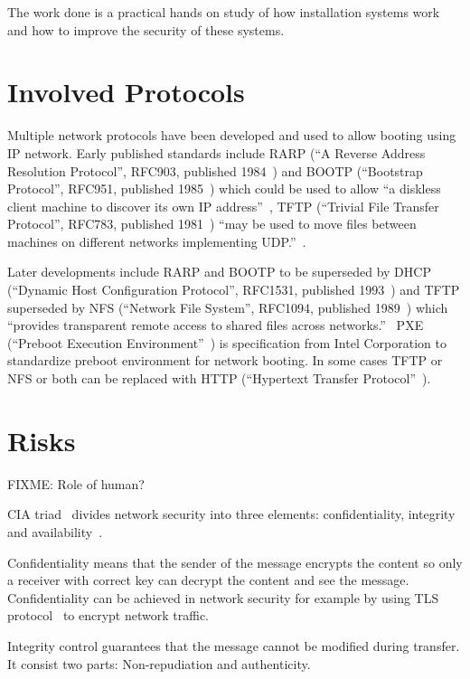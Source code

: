 The work done is a practical hands on study of how installation
systems work and how to improve the security of these systems.

\section{Involved Protocols}

Multiple network protocols have been developed and used to allow
booting using IP network. Early published standards include RARP (``A
Reverse Address Resolution Protocol'', RFC903, published
1984~\cite{RFC903}) and BOOTP (``Bootstrap Protocol'', RFC951,
published 1985~\cite{RFC951}) which could be used to allow ``a
diskless client machine to discover its own IP
address''~\cite{RFC951}, TFTP (``Trivial File Transfer Protocol'',
RFC783, published 1981~\cite{RFC783}) ``may be used to move files
between machines on different networks implementing
UDP.''~\cite{RFC783}.

Later developments include RARP and BOOTP to be superseded by DHCP
(``Dynamic Host Configuration Protocol'', RFC1531, published
1993~\cite{RFC1531}) and TFTP superseded by NFS (``Network File
System'', RFC1094, published 1989~\cite{RFC1094}) which ``provides
transparent remote access to shared files across
networks.''~\cite{RFC1094} PXE (``Preboot Execution
Environment''~\cite{PXEspec}) is specification from Intel Corporation
to standardize preboot environment for network booting. In some cases
TFTP or NFS or both can be replaced with HTTP (``Hypertext Transfer
Protocol''~\cite{RFC1945}\cite{RFC2616}).


\section{Risks}

FIXME: Role of human?

CIA triad~\cite{cia-triad} divides network security into three
elements: confidentiality, integrity and availability~\cite{anderson}.

Confidentiality means that the sender of the message encrypts the
content so only a receiver with correct key can decrypt the content
and see the message. Confidentiality can be achieved in network
security for example by using TLS protocol~\cite{RFC5246} to encrypt
network traffic.

Integrity control guarantees that the message cannot be modified
during transfer. It consist two parts: Non-repudiation and
authenticity.

